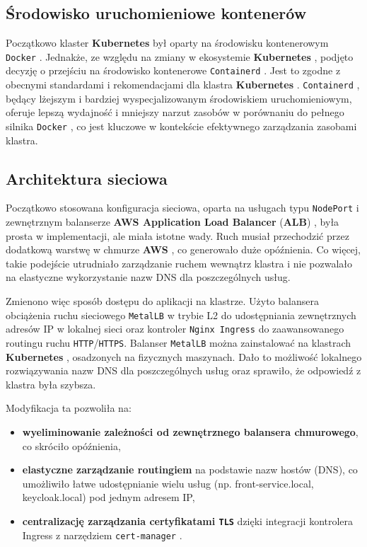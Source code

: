 \subsection{Środowisko uruchomieniowe kontenerów}

Początkowo klaster \textbf{Kubernetes} \cite{kubernetes} był oparty na środowisku kontenerowym \texttt{Docker} \cite{docker_docs}. Jednakże, ze względu na zmiany w ekosystemie \textbf{Kubernetes} \cite{kubernetes}, podjęto decyzję o przejściu na środowisko kontenerowe \texttt{Containerd} \cite{containerd_docs}. Jest to zgodne z obecnymi standardami i rekomendacjami dla klastra \textbf{Kubernetes} \cite{kubernetes}. \texttt{Containerd} \cite{containerd_docs}, będący lżejszym i bardziej wyspecjalizowanym środowiskiem uruchomieniowym, oferuje lepszą wydajność i mniejszy narzut zasobów w porównaniu do pełnego silnika \texttt{Docker} \cite{docker_docs}, co jest kluczowe w kontekście efektywnego zarządzania zasobami klastra.

\subsection{Architektura sieciowa}

Początkowo stosowana konfiguracja sieciowa, oparta na usługach typu \texttt{NodePort} \cite{nodeport_docs} i zewnętrznym balanserze \textbf{AWS Application Load Balancer} (\textbf{ALB}) \cite{alb_docs}, była prosta w implementacji, ale miała istotne wady. Ruch musiał przechodzić przez dodatkową warstwę w chmurze \textbf{AWS} \cite{aws_docs}, co generowało duże opóźnienia. Co więcej, takie podejście utrudniało zarządzanie ruchem wewnątrz klastra i nie pozwalało na elastyczne wykorzystanie nazw DNS dla poszczególnych usług.

Zmienono więc sposób dostępu do aplikacji na klastrze. Użyto balansera obciążenia ruchu sieciowego \texttt{MetalLB} \cite{metallb_docs} w trybie L2 do udostępniania zewnętrznych adresów IP w lokalnej sieci oraz kontroler \texttt{Nginx Ingress} \cite{nginx_ingress_docs} do zaawansowanego routingu ruchu \texttt{HTTP}/\texttt{HTTPS}. Balanser \texttt{MetalLB} \cite{metallb_docs} można zainstalować na klastrach \textbf{Kubernetes} \cite{kubernetes}, osadzonych na fizycznych maszynach. Dało to możliwość lokalnego rozwiązywania nazw DNS dla poszczególnych usług oraz sprawiło, że odpowiedź z klastra była szybsza.

Modyfikacja ta pozwoliła na:
\begin{itemize}
    \item \textbf{wyeliminowanie zależności od zewnętrznego balansera chmurowego}, co skróciło opóźnienia,
    \item \textbf{elastyczne zarządzanie routingiem} na podstawie nazw hostów (DNS), co umożliwiło łatwe udostępnianie wielu usług (np. front-service.local, keycloak.local) pod jednym adresem IP,
    \item \textbf{centralizację zarządzania certyfikatami \texttt{TLS}} dzięki integracji kontrolera Ingress z narzędziem \texttt{cert-manager} \cite{cert_manager_docs}.
\end{itemize}
